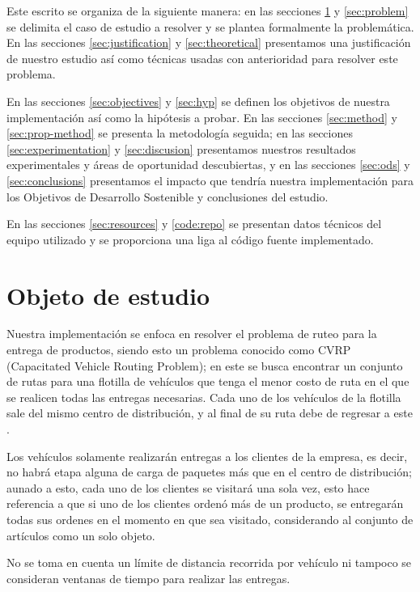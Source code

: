 \documentclass[journal]{IEEEtran}
\begin{document}
        Este escrito se organiza de la siguiente manera: en las secciones \ref{sec:case-study} y \ref{sec:problem} se delimita el caso de estudio a resolver y se plantea formalmente la problemática. En las secciones \ref{sec:justification} y \ref{sec:theoretical} presentamos una justificación de nuestro estudio así como técnicas usadas con anterioridad para resolver este problema.

        En las secciones \ref{sec:objectives} y \ref{sec:hyp} se definen los objetivos de nuestra implementación así como la hipótesis a probar. En las secciones \ref{sec:method} y \ref{sec:prop-method} se presenta la metodología seguida; en las secciones \ref{sec:experimentation} y \ref{sec:discusion} presentamos nuestros resultados experimentales y áreas de oportunidad descubiertas, y en las secciones \ref{sec:ods} y \ref{sec:conclusions} presentamos el impacto que tendría nuestra implementación para los Objetivos de Desarrollo Sostenible y conclusiones del estudio.

        En las secciones \ref{sec:resources} y \ref{code:repo} se presentan datos técnicos del equipo utilizado y se proporciona una liga al código fuente implementado.
        
    \section{Objeto de estudio} \label{sec:case-study}

        Nuestra implementación se enfoca en resolver el problema de ruteo para la entrega de productos, siendo esto un problema conocido como CVRP (Capacitated Vehicle Routing Problem); en este se busca encontrar un conjunto de rutas para una flotilla de vehículos que tenga el menor costo de ruta en el que se realicen todas las entregas necesarias. Cada uno de los vehículos de la flotilla sale del mismo centro de distribución, y al final de su ruta debe de regresar a este \cite{elshaer2020taxonomic}.

        Los vehículos solamente realizarán entregas a los clientes de la empresa, es decir, no habrá etapa alguna de carga de paquetes más que en el centro de distribución; aunado a esto, cada uno de los clientes se visitará una sola vez, esto hace referencia a que si uno de los clientes ordenó más de un producto, se entregarán todas sus ordenes en el momento en que sea visitado, considerando al conjunto de artículos como un solo objeto.
        
        No se toma en cuenta un límite de distancia recorrida por vehículo ni tampoco se consideran ventanas de tiempo para realizar las entregas.
    
\end{document}

